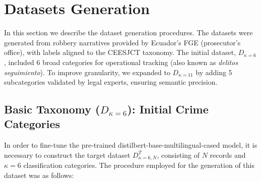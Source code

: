 \documentclass[onecolumn, journal, english, 12pt, a4paper]{IEEEtran} %
\newcommand{\modelohuggingface}{distilbert-base-multilingual-cased}
\theoremstyle{definition}
\begin{document}
\section{Datasets Generation}
\label{sec:datasets-generation}

In this section we describe the dataset generation procedures. The
datasets were generated from robbery narratives provided by Ecuador’s
FGE (prosecutor's office), with labels aligned to the CEESJCT
taxonomy. The initial dataset, \(D_{\kappa=6}\), included 6 broad
categories for operational tracking (also known as \textit{delitos
  seguimiento}). To improve granularity, we expanded to
\(D_{\kappa=11}\) by adding 5 subcategories validated by legal
experts, ensuring semantic precision.

\subsection{Basic Taxonomy (\(D_{\kappa=6}\)): Initial Crime
  Categories}
\label{sec:basic-taxon-d_seguimiento}
In order to fine-tune the pre-trained \modelohuggingface{} model, it
is necessary to construct the target dataset $D^T_{\kappa=6, N}$, consisting of
$N$ records and $\kappa=6$ classification categories. The procedure
employed for the generation of this dataset was as follows:
\end{document}
